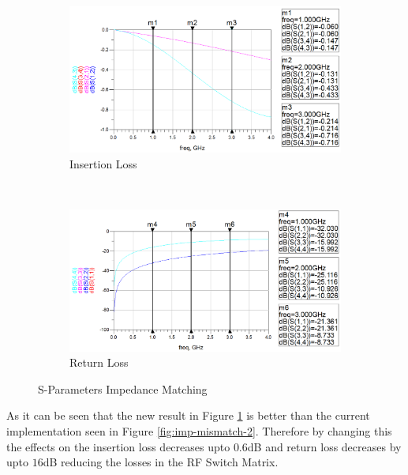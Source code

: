 \documentclass[12pt,openany,a4paper]{book}
\begin{document}
\begin{figure}[H]
    \centering
    \begin{subfigure}[t]{0.5\textwidth}
        \centering
        \includegraphics[width=1\textwidth]{mismatch-insertion.png}
        \caption{Insertion Loss}
    \end{subfigure}%
    ~ 
    \begin{subfigure}[t]{0.5\textwidth}
        \centering
        \includegraphics[width=1\textwidth]{mismatch-return.png}
        \caption{Return Loss}
    \end{subfigure}
    \caption{S-Parameters Impedance Matching}
    \label{fig:imp-mismatch-3}
\end{figure}
As it can be seen that the new result in Figure \ref{fig:imp-mismatch-3} is better than the current implementation seen in Figure \ref{fig:imp-mismatch-2}. Therefore by changing this the effects on the insertion loss decreases upto $0.6$dB and return loss decreases by upto $16$dB reducing the losses in the RF Switch Matrix.
\end{document}
